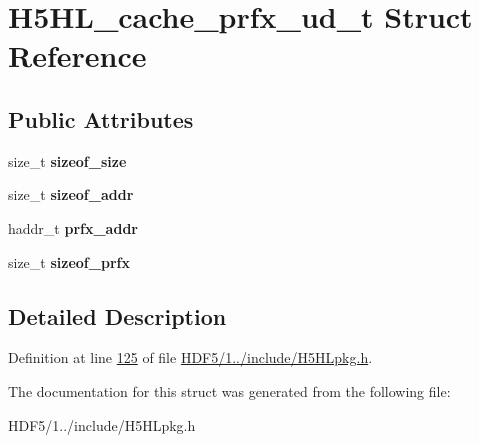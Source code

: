 \hypertarget{struct_h5_h_l__cache__prfx__ud__t}{}\section{H5\+H\+L\+\_\+cache\+\_\+prfx\+\_\+ud\+\_\+t Struct Reference}
\label{struct_h5_h_l__cache__prfx__ud__t}
\subsection*{Public Attributes}
\begin{DoxyCompactItemize}
\item 
\mbox{\label{struct_h5_h_l__cache__prfx__ud__t_a32b5c14960a8ed0f9880820b27a394d0}} 
size\+\_\+t {\bfseries sizeof\+\_\+size}
\item 
\mbox{\label{struct_h5_h_l__cache__prfx__ud__t_a3de7f76c5df5ccf06f775d048e6a484e}} 
size\+\_\+t {\bfseries sizeof\+\_\+addr}
\item 
\mbox{\label{struct_h5_h_l__cache__prfx__ud__t_a9d496b38e3041a64446edf46ccc94d91}} 
haddr\+\_\+t {\bfseries prfx\+\_\+addr}
\item 
\mbox{\label{struct_h5_h_l__cache__prfx__ud__t_a0db5c21f2f38a8d60c48cec980af37d5}} 
size\+\_\+t {\bfseries sizeof\+\_\+prfx}
\end{DoxyCompactItemize}


\subsection{Detailed Description}


Definition at line \hyperlink{_h_d_f5_21_810_81_2include_2_h5_h_lpkg_8h_source_l00125}{125} of file \hyperlink{_h_d_f5_21_810_81_2include_2_h5_h_lpkg_8h_source}{H\+D\+F5/1../include/\+H5\+H\+Lpkg.\+h}.



The documentation for this struct was generated from the following file\+:\begin{DoxyCompactItemize}
\item 
H\+D\+F5/1../include/\+H5\+H\+Lpkg.\+h\end{DoxyCompactItemize}
